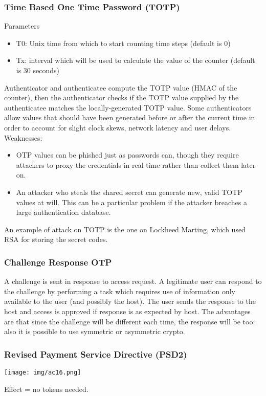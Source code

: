 \documentclass[a4paper, 10pt, titlepage]{article}
\begin{document}
\subsubsection{Time Based One Time Password (TOTP)}
Parameters
\begin{itemize}
\item T0: Unix time from which to start counting time steps (default is 0)
\item Tx: interval which will be used to calculate the value of the counter (default is 30 seconds)
\end{itemize}
Authenticator and authenticatee compute the TOTP value (HMAC of the counter), then the authenticator checks if the TOTP value supplied by the authenticatee matches the locally-generated TOTP value. Some authenticators allow values that should have been generated before or after the current time in order to account for slight clock skews, network latency and user delays. \medskip\\
Weaknesses:
\begin{itemize}
\item OTP values can be phished just as passwords can, though they require attackers to proxy the credentials in real time rather than collect them later on.
\item An attacker who steals the shared secret can generate new, valid TOTP values at will. This can be a particular problem if the attacker breaches a large authentication database.
\end{itemize}  
An example of attack on TOTP is the one on Lockheed Marting, which used RSA for storing the secret codes.

\subsubsection{Challenge Response OTP}
A challenge is sent in response to access request. A legitimate user can respond to the challenge by performing a task which requires use of information only available to the user (and possibly the host). The user sends the response to the host and access is approved if response is as expected by host. The advantages are that since the challenge will be different each time, the response will be too; also it is possible to use symmetric or asymmetric crypto.

\subsubsection{Revised Payment Service Directive (PSD2)}
\begin{center}
\texttt{[image: img/ac16.png]}
\end{center}
Effect = no tokens needed.
\end{document}
